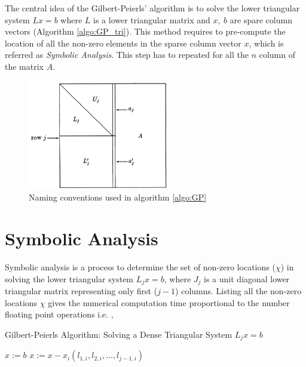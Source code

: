 The central idea of the Gilbert-Peierls' algorithm \cite{GPAlgo} is to solve the lower triangular
system \(Lx = b\) where \(L\) is a lower triangular matrix and \(x,\ b \) are 
spare column vectors (Algorithm \ref{algo:GP_tri}). This method requires to pre-compute the location of all
the non-zero elements in the sparse column vector $x$, which is referred as 
\textit{Symbolic Analysis}. This step has to repeated for all the $n$ column of 
the matrix $A$.


\begin{figure}
    \centering
    \includegraphics[width = 0.55\textwidth]{./Theory/gpConvention.JPG}
    \caption{Naming conventions used in algorithm \ref{algo:GP}}
    \label{fig:GP:namingConvention}
\end{figure}

\pagebreak

\section{Symbolic Analysis}

Symbolic analysis is a process to determine the set of non-zero locations ($\chi$)
in solving the lower triangular system $L_j x = b$, where $J_j$ is a unit diagonal 
lower triangular matrix representing only first ($j-1$) columns. Listing all 
the non-zero locations \(\chi\) gives the numerical computation time proportional to
the number floating point operations i.e. ,

\begin{algorithm}
    \caption{Gilbert-Peierls Algorithm: Solving a Dense Triangular System $L_j x = b$
        \label{algo:GP_dense_tri}}
    \begin{algorithmic}[1]
        \Statex
        \State $x := b$
            \State $x := x - x_{i}  (l_{1,i}, l_{2,i}, \dots, l_{j-1,i})$
        \EndFor
    \end{algorithmic}
\end{algorithm}

